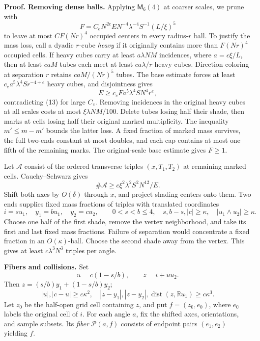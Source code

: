 \documentclass[
  11pt,
  a4paper,
]{article}
\begin{document}
\textbf{Proof. Removing dense balls.} Applying \(\mathsf M_6(4)\) at
coarser scales, we prune with \[
 F=C_eN^{2e}EN^{-4}\lambda^{-4}S^{-1}(L/\xi)^5
\tag{13}\label{eq:13}
\] to leave at most \(CF(Nr)^4\) occupied centers in every radius-\(r\)
ball. To justify the mass loss, call a dyadic \(r\)-cube \emph{heavy} if
it originally contains more than \(F(Nr)^4\) occupied cells. If heavy
cubes carry at least \(a\lambda NM\) incidences, where \(a=c\xi/L\),
then at least \(caM\) tubes each meet at least \(ca\lambda/r\) heavy
cubes. Direction coloring at separation \(r\) retains \(caM/(Nr)^5\)
tubes. The base estimate forces at least \(c_ea^5\lambda^4Sr^{-4+e}\)
heavy cubes, and disjointness gives \[
 E\ge c_eFa^5\lambda^4SN^4r^e,
\] contradicting (13) for large \(C_e\). Removing incidences in the
original heavy cubes at all scales costs at most \(\xi\lambda NM/100\).
Delete tubes losing half their shade, then marks at cells losing half
their original marked multiplicity. The inequality \(m'\le m-m'\) bounds
the latter loss. A fixed fraction of marked mass survives, the full
two-ends constant at most doubles, and each cap contains at most one
fifth of the remaining marks. The original-scale base estimate gives
\(F\ge1\).

Let \(\mathcal A\) consist of the ordered transverse triples
\((x,T_1,T_2)\) at remaining marked cells. Cauchy--Schwarz gives \[
 \#\mathcal A\ge c\xi^2\lambda^2S^2N^{12}/E.
\tag{14}\label{eq:14}
\] Shift both axes by \(O(\delta)\) through \(x\), and project shading
centers onto them. Two ends supplies fixed mass fractions of triples
with translated coordinates \[
 i=s u_1,\quad y_1=b u_1,\quad y_2=c u_2,\qquad
 0<s<b\le4,\quad s,b-s,|c|\ge\kappa,\quad
 |u_1\wedge u_2|\ge\kappa.
\tag{15}\label{eq:15}
\] Choose one half of the first shade, remove the vertex neighborhood,
and take its first and last fixed mass fractions. Failure of separation
would concentrate a fixed fraction in an \(O(\kappa)\)-ball. Choose the
second shade away from the vertex. This gives at least \(c\lambda^3N^3\)
triples per angle.

\textbf{Fibers and collisions.} Set \[
 u=c(1-s/b),\qquad z=i+u u_2.
\] Then \(z=(s/b)y_1+(1-s/b)y_2\); \[
 |u|,|c-u|\ge c\kappa^2,\quad
 |z-y_1|,|z-y_2|,\operatorname{dist}(z,\mathbb Ru_1)
 \ge c\kappa^3.
\tag{16}\label{eq:16}
\] Let \(z_0\) be the half-open grid cell containing \(z\), and put
\(f=(z_0,e_0)\), where \(e_0\) labels the original cell of \(i\). For
each angle \(a\), fix the shifted axes, orientations, and sample
subsets. Its \emph{fiber} \(\mathcal P(a,f)\) consists of endpoint pairs
\((e_1,e_2)\) yielding \(f\).
\end{document}
